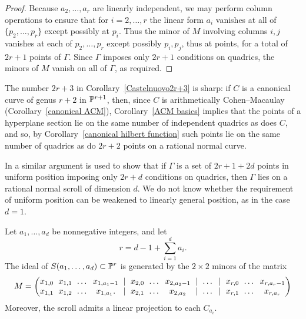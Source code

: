 \begin{proof}
Because $a_2,\dots, a_r$ are linearly independent,
we may perform column operations to ensure that for $i=2, \dots, r$
the linear form
$a_i$ vanishes at all of $\{p_2,\dots, p_{r}\}$ except possibly at $p_i$.
Thus the minor of $M$ involving columns $i,j$ vanishes at each of
$p_2,\dots, p_r$ except possibly
$p_i,p_j$, thus at 
points, for a total of $2r+1$ points
of $\Gamma$. Since
$\Gamma$ imposes only $2r+1$ conditions on quadrics, the minors of $M$
vanish on all of $\Gamma$,
as required.
\end{proof}

The number $2r+3$ in Corollary~\ref{Castelnuovo2r+3} is sharp: if $C$
is a canonical curve of genus $r+2$ in ${\mathbb P}^{r+1}$, then, since $C$
is arithmetically Cohen--Macaulay (Corollary~\ref{canonical ACM}),
Corollary~\ref{ACM basics} implies that the points of a hyperplane
section lie on the same number of independent quadrics as does $C$,
and so,
by Corollary~\ref{canonical hilbert function} such points lie on the
same number of
quadrics as do $2r+2$ points on a rational normal curve.

\begin{fact}
In \cite{MR685427} a similar argument is used to show that if $\Gamma$
is a set of 
$2r+1+2d$ points in uniform position
imposing only
$2r+d$ conditions on quadrics, then $\Gamma$ lies on a rational normal
scroll of dimension $d$.
We do not know whether the requirement of 
%
uniform position can be weakened
to linearly general position,
as in the case $d=1$.
\end{fact}

\begin{corollary}\label{equations of scrolls} Let $a_{1}, \dots, a_{d}$
be nonnegative integers, and let
$$r = d-1+\sum_{i=1}^{d} a_{i}.$$
The ideal of $S(a_{1},\dots,a_{d})\subset {\mathbb P}^{r}$ is generated by the
%
$2\times 2$ minors of the matrix
$$
\setcounter{MaxMatrixCols}{20}
\arraycolsep=3pt
M = \begin{pmatrix}
x_{1,0}&x_{1,1}&\dots&x_{1, a_{1}-1}&|&x_{2,0}&\dots&x_{2,
a_{2}-1}&|&\dots&|&x_{r,0}&\dots&x_{r, a_{r}-1}\\
x_{1,1}&x_{1,2}&\dots&x_{1, a_{1}}.  &|&x_{2,1}&\dots&x_{2,
a_{2}}&|&\dots&|&x_{r,1}&\dots&x_{r, a_{r}}
\end{pmatrix}
$$
Moreover, the scroll admits a linear projection to each $C_{a_i}$.
\unif
\end{corollary}

